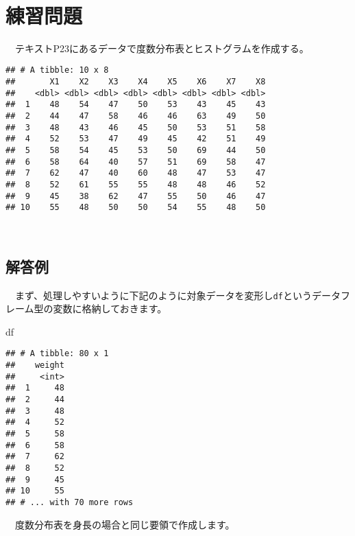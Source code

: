 \documentclass[
  12pt,
]{book}
\newenvironment{Shaded}{\begin{snugshade}}{\end{snugshade}}
\newcommand{\NormalTok}[1]{#1}
\begin{document}
　

\hypertarget{ux7df4ux7fd2ux554fux984c}{%
\section{練習問題}\label{ux7df4ux7fd2ux554fux984c}}

　テキストP23にあるデータで度数分布表とヒストグラムを作成する。

\begin{verbatim}
## # A tibble: 10 x 8
##       X1    X2    X3    X4    X5    X6    X7    X8
##    <dbl> <dbl> <dbl> <dbl> <dbl> <dbl> <dbl> <dbl>
##  1    48    54    47    50    53    43    45    43
##  2    44    47    58    46    46    63    49    50
##  3    48    43    46    45    50    53    51    58
##  4    52    53    47    49    45    42    51    49
##  5    58    54    45    53    50    69    44    50
##  6    58    64    40    57    51    69    58    47
##  7    62    47    40    60    48    47    53    47
##  8    52    61    55    55    48    48    46    52
##  9    45    38    62    47    55    50    46    47
## 10    55    48    50    50    54    55    48    50
\end{verbatim}

　

\hypertarget{ux89e3ux7b54ux4f8b}{%
\subsection*{解答例}\label{ux89e3ux7b54ux4f8b}}

　まず、処理しやすいように下記のように対象データを変形し\texttt{df}というデータフレーム型の変数に格納しておきます。

\begin{Shaded}
\begin{Highlighting}[]
\NormalTok{df}
\end{Highlighting}
\end{Shaded}

\begin{verbatim}
## # A tibble: 80 x 1
##    weight
##     <int>
##  1     48
##  2     44
##  3     48
##  4     52
##  5     58
##  6     58
##  7     62
##  8     52
##  9     45
## 10     55
## # ... with 70 more rows
\end{verbatim}

　度数分布表を身長の場合と同じ要領で作成します。
\end{document}
